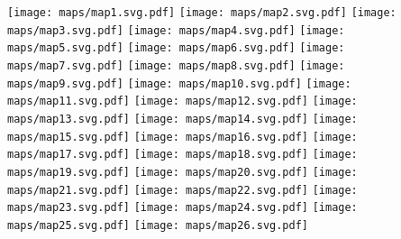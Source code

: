 \documentclass{article}
\begin{document}
\noindent
\texttt{[image: maps/map1.svg.pdf]}
\break
\break
\texttt{[image: maps/map2.svg.pdf]}
\texttt{[image: maps/map3.svg.pdf]}
\break
\break
\texttt{[image: maps/map4.svg.pdf]}
\texttt{[image: maps/map5.svg.pdf]}
\break
\break
\texttt{[image: maps/map6.svg.pdf]}
\texttt{[image: maps/map7.svg.pdf]}
\break
\break
\texttt{[image: maps/map8.svg.pdf]}
\texttt{[image: maps/map9.svg.pdf]}
\break
\break
\texttt{[image: maps/map10.svg.pdf]}
\texttt{[image: maps/map11.svg.pdf]}
\break
\break
\texttt{[image: maps/map12.svg.pdf]}
\texttt{[image: maps/map13.svg.pdf]}
\break
\break
\texttt{[image: maps/map14.svg.pdf]}
\texttt{[image: maps/map15.svg.pdf]}
\break
\break
\texttt{[image: maps/map16.svg.pdf]}
\texttt{[image: maps/map17.svg.pdf]}
\break
\break
\texttt{[image: maps/map18.svg.pdf]}
\texttt{[image: maps/map19.svg.pdf]}
\break
\break
\texttt{[image: maps/map20.svg.pdf]}
\texttt{[image: maps/map21.svg.pdf]}
\break
\break
\texttt{[image: maps/map22.svg.pdf]}
\texttt{[image: maps/map23.svg.pdf]}
\break
\break
\texttt{[image: maps/map24.svg.pdf]}
\texttt{[image: maps/map25.svg.pdf]}
\break
\break
\texttt{[image: maps/map26.svg.pdf]}
\end{document}
